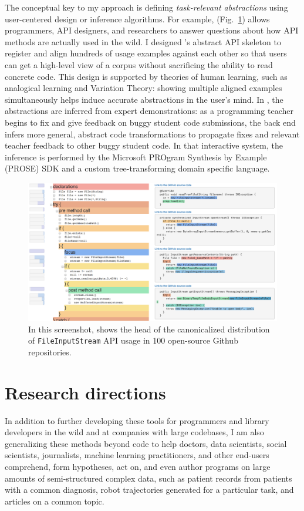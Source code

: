 \documentclass[justified]{tufte-handout}
\begin{document}
The conceptual key to my approach is defining \emph{task-relevant abstractions} using user-centered design or inference algorithms. For example,  (Fig.~\ref{fig:examplore}) allows programmers, API designers, and researchers to answer questions about how API methods are actually used in the wild.\cite{examplore} I designed 's abstract API skeleton to register and align hundreds of usage examples against each other so that users can get a high-level view of a corpus without sacrificing the ability to read concrete code. This design is supported by theories of human learning, such as analogical learning and Variation Theory: showing multiple aligned examples simultaneously helps induce accurate abstractions in the user's mind. In , the abstractions are inferred from expert demonstrations: as a programming teacher begins to fix and give feedback on buggy student code submissions, the back end infers more general, abstract code transformations to propagate fixes and relevant teacher feedback to other buggy student code.\cite{lats17} In that interactive system, the inference is performed by the Microsoft PROgram Synthesis by Example (PROSE) SDK and a custom tree-transforming domain specific language.
\begin{figure}[h]
  \includegraphics[width=0.64\linewidth]{Statistical_Code_Examples.png}
  \caption{In this screenshot,  shows the head of the canonicalized distribution of \texttt{FileInputStream} API usage in 100 open-source Github repositories.}%
  \label{fig:examplore}%
\end{figure}

\section{Research directions}

In addition to further developing these tools for programmers and library developers in the wild and at companies with large codebases, I am also generalizing these methods beyond code to help doctors, data scientists, social scientists, journalists, machine learning practitioners, and other end-users comprehend, form hypotheses, act on, and even author programs on large amounts of semi-structured complex data, such as patient records from patients with a common diagnosis, robot trajectories generated for a particular task, and articles on a common topic.%
\end{document}

